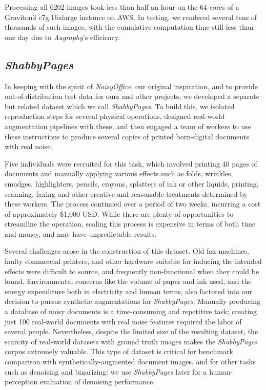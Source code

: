 \documentclass[runningheads]{llncs}
\begin{document}
Processing all 6202 images took less than half an hour on the 64 cores of a Graviton3 c7g.16xlarge instance on AWS. In testing, we rendered several tens of thousands of such images, with the cumulative computation time still less than one day due to \emph{Augraphy}'s efficiency.

\subsection{\emph{ShabbyPages}}
In keeping with the spirit of \emph{NoisyOffice}, our original inspiration, and to provide out-of-distribution test data for ours and other projects, we developed a separate but related dataset which we call \emph{ShabbyPages}. To build this, we isolated reproduction steps for several physical operations, designed real-world augmentation pipelines with these, and then engaged a team of workers to use these instructions to produce several copies of printed born-digital documents with real noise.

Five individuals were recruited for this task, which involved printing 40 pages of documents and manually applying various effects such as folds, wrinkles, smudges, highlighters, pencils, crayons, splatters of ink or other liquids, printing, scanning, faxing and other creative and reasonable treatments determined by these workers.
The process continued over a period of two weeks, incurring a cost of approximately \$1,000 USD.
While there are plenty of opportunities to streamline the operation, scaling this process is expensive in terms of both time and money, and may have unpredictable results.

Several challenges arose in the construction of this dataset.
Old fax machines, faulty commercial printers, and other hardware suitable for inducing the intended effects were difficult to source, and frequently non-functional when they could be found.
Environmental concerns like the volume of paper and ink used, and the energy expenditure both in electricity and human terms, also factored into our decision to pursue synthetic augmentations for \emph{ShabbyPages}.
Manually producing a database of noisy documents is a time-consuming and repetitive task; creating just 100 real-world documents with real noise features required the labor of several people.
Nevertheless, despite the limited size of the resulting dataset, the scarcity of real-world datasets with ground truth images makes the \emph{ShabbyPages} corpus extremely valuable.
This type of dataset is critical for benchmark comparison with synthetically-augmented document images, and for other tasks such as denoising and binarizing: we use \emph{ShabbyPages} later for a human-perception evaluation of denoising performance.
\end{document}
